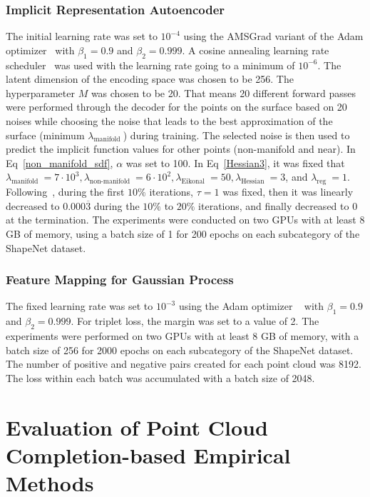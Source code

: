         \subsubsection{Implicit Representation Autoencoder}
        The initial learning rate was set to $10^{-4}$ using the AMSGrad variant of the Adam optimizer~\cite{AMSGrad} with $\beta_1 = 0.9$ and $\beta_2 = 0.999$. A cosine annealing learning rate scheduler~\cite{CosLR} was used with the learning rate going to a minimum of $10^{-6}$. The latent dimension of the encoding space was chosen to be 256. The hyperparameter $M$ was chosen to be 20. That means 20 different forward passes were performed through the decoder for the points on the surface based on 20 noises while choosing the noise that leads to the best approximation of the surface (minimum $\lambda_{\text {manifold }}$) during training. The selected noise is then used to predict the implicit function values for other points (non-manifold and near). In Eq~\ref{non_manifold_sdf}, $\alpha$ was set to 100. In Eq~\ref{Hessian3}, it was fixed that $\lambda_{\text {manifold }} = 7\cdot 10^3, \lambda_{\text {non-manifold }} = 6\cdot 10^2, \lambda_{\text {Eikonal }} = 50, \lambda_{\text{Hessian }} = 3$, and $\lambda_{\text {reg }} = 1$. Following~\cite{NeuralHessian}, during the first $10\%$ iterations, $\tau = 1$ was fixed, then it was linearly decreased to $0.000\overline{3}$ during the $10\%$ to $20\%$ iterations, and finally decreased to $0$ at the termination. The experiments were conducted on two GPUs with at least 8 GB of memory, using a batch size of 1 for 200 epochs on each subcategory of the ShapeNet dataset. 

        \subsubsection{Feature Mapping for Gaussian Process}
        The fixed learning rate was set to $10^{-3}$ using the Adam optimizer ~\cite{Adam} with $\beta_1 = 0.9$ and $\beta_2 = 0.999$. For triplet loss, the margin was set to a value of 2. The experiments were performed on two GPUs with at least 8 GB of memory, with a batch size of 256 for 2000 epochs on each subcategory of the ShapeNet dataset. The number of positive and negative pairs created for each point cloud was 8192. The loss within each batch was accumulated with a batch size of 2048.
        


\section{Evaluation of Point Cloud Completion-based Empirical Methods}\label{pccComp}


